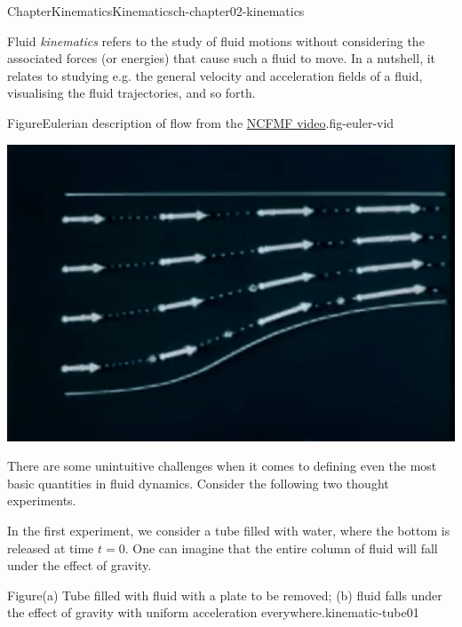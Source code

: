 \documentclass[oneside,10pt,]{book}
\numberwithin{equation}{section}
\begin{document}
%
%
\typeout{************************************************}
\typeout{************************************************}
%
\begin{chapterptx}{Chapter}{Kinematics}{}{Kinematics}{}{}{ch-chapter02-kinematics}
\renewcommand*{\chaptername}{Chapter}
\begin{introduction}{}%
Fluid \emph{kinematics} refers to the study of fluid motions without considering the associated forces (or energies) that cause such a fluid to move. In a nutshell, it relates to studying e.g. the general velocity and acceleration fields of a fluid, visualising the fluid trajectories, and so forth.%
\begin{figureptx}{Figure}{Eulerian description of flow from the \href{https://techtv.mit.edu/collections/ifluids/videos/32597-eulerian-and-lagrangian-descriptions-in-fluid-mechanics}{NCFMF video}.}{fig-euler-vid}{}%
\begin{image}{0.15}{0.7}{0.15}{}%
\includegraphics[width=\linewidth]{external/01_euler_trim.png}
\end{image}%
\tcblower
\end{figureptx}%
There are some unintuitive challenges when it comes to defining even the most basic quantities in fluid dynamics. Consider the following two thought experiments.%
\par
In the first experiment, we consider a tube filled with water, where the bottom is released at time \(t = 0\). One can imagine that the entire column of fluid will fall under the effect of gravity.%
\begin{figureptx}{Figure}{(a) Tube filled with fluid with a plate to be removed; (b) fluid falls under the effect of gravity with uniform acceleration everywhere.}{kinematic-tube01}{}%

\end{figureptx}
\end{introduction}
\end{chapterptx}
\end{document}
